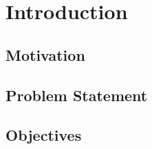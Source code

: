 \chapter{Introduction}
\lipsum[2]
\section{Motivation}
\lipsum[4]
\section{Problem Statement}
\lipsum[3]
\section{Objectives}
\lipsum[2]
